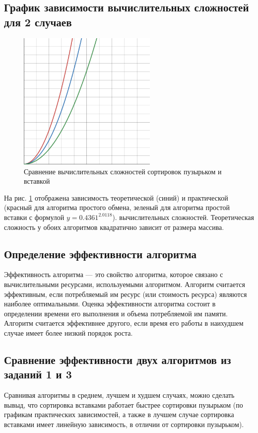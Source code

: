 \documentclass[14pt]{extarticle}
\begin{document}
\subsection{График зависимости вычислительных сложностей для 2 случаев}
\begin{figure}[htpb]
  \centering
  \includegraphics[width=0.6\textwidth]{pictures/desmos_third.png}
  \caption{Сравнение вычислительных сложностей сортировок пузырьком и вставкой}
  \label{fig:graph_3}
\end{figure}
На рис. \ref{fig:graph_3} отображена зависимость теоретической (синий) и практической
(красный для алгоритма простого обмена, зеленый для алгоритма простой вставки с
формулой
$y=0.4361^{2.0118}$).
вычислительных сложностей. Теоретическая сложность у
обоих алгоритмов квадратично зависит от размера массива.
\subsection{Определение эффективности алгоритма}
Эффективность алгоритма — это свойство алгоритма, которое связано с
вычислительными ресурсами, используемыми алгоритмом. Алгоритм считается
эффективным, если потребляемый им ресурс (или стоимость ресурса) являются
наиболее оптимальными. Оценка эффективности алгоритма состоит в определении
времени его выполнения и объема потребляемой им памяти. Алгоритм считается
эффективнее другого, если время его работы в наихудшем случае имеет более
низкий порядок роста.
\subsection{Сравнение эффективности двух алгоритмов из заданий 1 и 3}
Сравнивая алгоритмы в среднем, лучшем и худшем случаях, можно сделать вывыд,
что сортировка вставками работает быстрее сортировки пузырьком (по графикам
практических зависимостей,
а также в лучшем случае сортировка вставками имеет линейную зависимость, в отличии
от сортировки пузырьком).
\newpage
\end{document}
